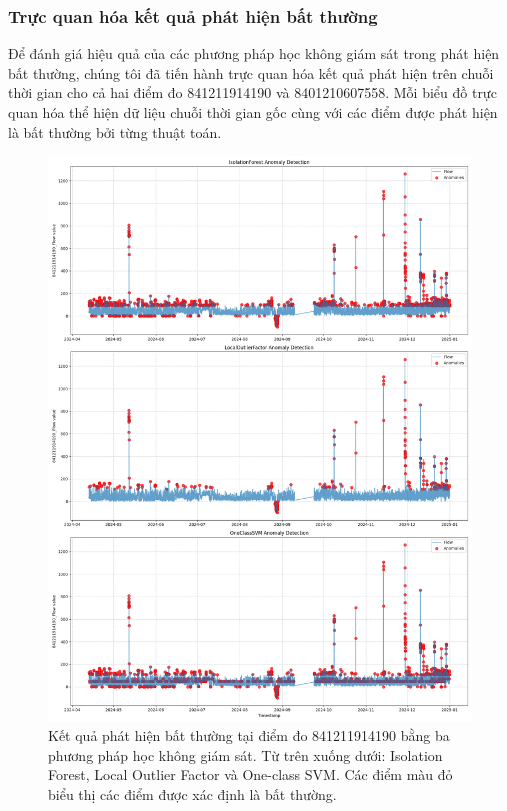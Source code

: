 \subsubsection{Trực quan hóa kết quả phát hiện bất thường}

Để đánh giá hiệu quả của các phương pháp học không giám sát trong phát hiện bất thường, chúng tôi đã tiến hành trực quan hóa kết quả phát hiện trên chuỗi thời gian cho cả hai điểm đo 841211914190 và 8401210607558. Mỗi biểu đồ trực quan hóa thể hiện dữ liệu chuỗi thời gian gốc cùng với các điểm được phát hiện là bất thường bởi từng thuật toán.

\begin{figure}[htbp]
    \centering
    \includegraphics[width=\textwidth]{image/section6_1/anomalies_subplots_841211914190.png}
    \caption{Kết quả phát hiện bất thường tại điểm đo 841211914190 bằng ba phương pháp học không giám sát. Từ trên xuống dưới: Isolation Forest, Local Outlier Factor và One-class SVM. Các điểm màu đỏ biểu thị các điểm được xác định là bất thường.}
    \label{fig:anomaly_subplots_841211914190}
\end{figure}

